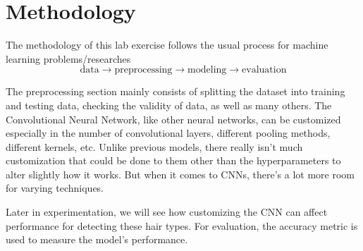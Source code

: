 \section{Methodology}

The methodology of this lab exercise follows the usual process for machine learning problems/researches
\[
  \text{data} \to \text{preprocessing} \to \text{modeling} \to \text{evaluation}
\]

The preprocessing section mainly consists of splitting the dataset into training and testing data, checking the validity of data, as well as many others. The Convolutional Neural Network, like other neural networks, can be customized especially in the number of convolutional layers, different pooling methods, different kernels, etc. Unlike previous models, there really isn't much customization that could be done to them other than the hyperparameters to alter slightly how it works. But when it comes to CNNs, there's a lot more room for varying techniques. 

Later in experimentation, we will see how customizing the CNN can affect performance for detecting these hair types. For evaluation, the accuracy metric is used to measure the model's performance. 

